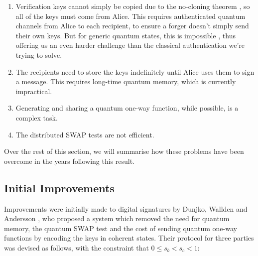 \documentclass[%
 reprint,
 amsmath,amssymb,
 aps,
 pra,
]{revtex4-1}
\begin{document}
\begin{enumerate}
\item Verification keys cannot simply be copied due to the no-cloning theorem \cite{WZ82}, so all of the keys must come from Alice. This requires authenticated quantum channels from Alice to each recipient, to ensure a forger doesn't simply send their own keys. But for generic quantum states, this is impossible \cite{1181969}, thus offering us an even harder challenge than the classical authentication we're trying to solve.
\item The recipients need to store the keys indefinitely until Alice uses them to sign a message. This requires long-time quantum memory, which is currently impractical.
\item Generating and sharing a quantum one-way function, while possible, is a complex task.
\item The distributed SWAP tests are not efficient.
\end{enumerate}

Over the rest of this section, we will summarise how these problems have been overcome in the years following this result.

\subsection{Initial Improvements}
\label{ssec:no-qmem}

Improvements were initially made to digital signatures by Dunjko, Wallden and Andersson \cite{PhysRevLett.112.040502}, who proposed a system which removed the need for quantum memory, the quantum SWAP test and the cost of sending quantum one-way functions by encoding the keys in coherent states. Their protocol for three parties was devised as follows, with the constraint that $0 \leq s_b < s_c < 1$:
\end{document}
